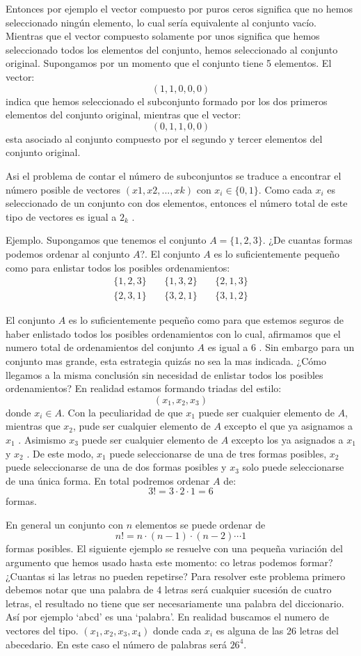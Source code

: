 \documentclass[14pt]{extreport}
\theoremstyle{definicion}
\theoremstyle{propiedad}
\begin{document}
Entonces por ejemplo el vector compuesto por puros ceros significa que no hemos seleccionado ningún elemento, lo cual sería equivalente al conjunto vacío. Mientras que el vector compuesto solamente por unos significa que hemos seleccionado todos los elementos del conjunto, hemos seleccionado al conjunto original. Supongamos por un momento que el conjunto tiene 5 elementos. El vector:
$$
  (1, 1, 0, 0, 0)
$$
indica que hemos seleccionado el subconjunto formado por los dos primeros elementos del conjunto original, mientras que el vector:
$$
  (0, 1, 1, 0, 0)
$$
esta asociado al conjunto compuesto por el segundo y tercer elementos del conjunto original.

Asi el problema de contar el número de subconjuntos se traduce a encontrar el número posible de vectores $(x1 , x2 , . . . , xk
  )$ con $x_i \in \{0, 1\}$. Como cada $x_i$ es seleccionado de un conjunto con dos elementos, entonces el número total de este tipo de vectores es igual a $2_k$ .

Ejemplo. Supongamos que tenemos el conjunto $A = \{1, 2, 3\}$. ¿De cuantas formas podemos ordenar al conjunto $A$?. El conjunto $A$ es lo suficientemente pequeño como para enlistar todos los posibles ordenamientos:
\begin{align*}
  \{1, 2, 3\} & \  & \{1, 3, 2\} & \  & \{2, 1, 3\} \\
  \{2, 3, 1\} & \  & \{3, 2, 1\} & \  & \{3, 1, 2\}
\end{align*}

El conjunto $A$ es lo suficientemente pequeño como para que estemos seguros de haber enlistado todos los posibles ordenamientos con lo cual, afirmamos que el numero total de ordenamientos del conjunto $A$ es igual a 6 . Sin embargo para un conjunto mas grande, esta estrategia quizás no sea la mas indicada. ¿Cómo llegamos a la misma conclusión sin necesidad de enlistar todos los posibles ordenamientos? En realidad estamos formando triadas del estilo:
$$
  (x_1, x_2, x_3)
$$
donde $x_i \in A$. Con la peculiaridad de que $x_1$ puede ser cualquier elemento de $A$, mientras que $x_2$, pude ser cualquier elemento de $A$ excepto el que ya asignamos a $x_1$ . Asimismo $x_3$ puede ser cualquier elemento de $A$ excepto los ya asignados a $x_1$ y $x_2$ . De este modo, $x_1$ puede seleccionarse de una de tres formas posibles, $x_2$ puede seleccionarse de una de dos formas posibles y $x_3$ solo puede seleccionarse de una única forma. En total podremos ordenar $A$ de:
$$
  3! = 3 \cdot 2 \cdot 1 = 6
$$
formas.

En general un conjunto con $n$ elementos se puede ordenar de
$$n! = n \cdot (n - 1) \cdot (n - 2)\cdots 1
$$
formas posibles.  El siguiente ejemplo se resuelve con una pequeña variación del argumento que hemos usado hasta este momento:
co letras podemos formar? ¿Cuantas si las letras no pueden repetirse? Para resolver este problema primero debemos notar que una palabra de 4 letras será cualquier sucesión de cuatro letras, el resultado no tiene que ser necesariamente una palabra del diccionario. Así por ejemplo `abcd' es una `palabra'. En realidad buscamos el numero de vectores del tipo. $(x_1 , x_2 , x_3 , x_4 )$ donde cada $x_i$ es alguna de las 26 letras del abecedario. En este caso el número de palabras será $26^4$.
\end{document}
